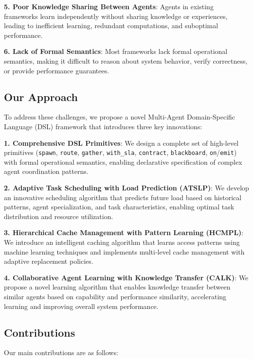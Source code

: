 \documentclass[conference]{IEEEtran}
\begin{document}
\textbf{5. Poor Knowledge Sharing Between Agents}: Agents in existing frameworks learn independently without sharing knowledge or experiences, leading to inefficient learning, redundant computations, and suboptimal performance.

\textbf{6. Lack of Formal Semantics}: Most frameworks lack formal operational semantics, making it difficult to reason about system behavior, verify correctness, or provide performance guarantees.

\subsection{Our Approach}

To address these challenges, we propose a novel Multi-Agent Domain-Specific Language (DSL) framework that introduces three key innovations:

\textbf{1. Comprehensive DSL Primitives}: We design a complete set of high-level primitives (\texttt{spawn}, \texttt{route}, \texttt{gather}, \texttt{with\_sla}, \texttt{contract}, \texttt{blackboard}, \texttt{on}/\texttt{emit}) with formal operational semantics, enabling declarative specification of complex agent coordination patterns.

\textbf{2. Adaptive Task Scheduling with Load Prediction (ATSLP)}: We develop an innovative scheduling algorithm that predicts future load based on historical patterns, agent specialization, and task characteristics, enabling optimal task distribution and resource utilization.

\textbf{3. Hierarchical Cache Management with Pattern Learning (HCMPL)}: We introduce an intelligent caching algorithm that learns access patterns using machine learning techniques and implements multi-level cache management with adaptive replacement policies.

\textbf{4. Collaborative Agent Learning with Knowledge Transfer (CALK)}: We propose a novel learning algorithm that enables knowledge transfer between similar agents based on capability and performance similarity, accelerating learning and improving overall system performance.

\subsection{Contributions}

Our main contributions are as follows:
\end{document}
